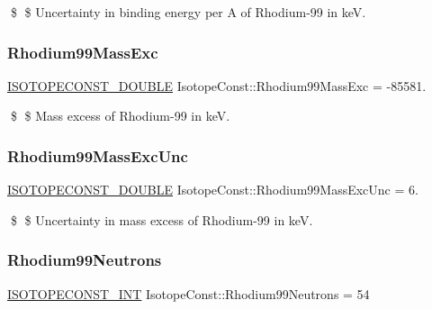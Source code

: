 \$ \$ Uncertainty in binding energy per A of Rhodium-\/99 in keV. \mbox{\label{group___isotope_const-_rhodium-_rh99_ga7954426193fc2316bc047005fba67513}} 
\subsubsection{\texorpdfstring{Rhodium99\+Mass\+Exc}{Rhodium99MassExc}}
{\footnotesize\ttfamily \mbox{\hyperlink{group___isotope_const-_macros_ga8f45a7272ce02c0b4c65c44636ed719a}{I\+S\+O\+T\+O\+P\+E\+C\+O\+N\+S\+T\+\_\+\+D\+O\+U\+B\+LE}} Isotope\+Const\+::\+Rhodium99\+Mass\+Exc = -\/85581.}

\$ \$ Mass excess of Rhodium-\/99 in keV. \mbox{\label{group___isotope_const-_rhodium-_rh99_gab2613ebd2253d2cae677561e1a05a273}} 
\subsubsection{\texorpdfstring{Rhodium99\+Mass\+Exc\+Unc}{Rhodium99MassExcUnc}}
{\footnotesize\ttfamily \mbox{\hyperlink{group___isotope_const-_macros_ga8f45a7272ce02c0b4c65c44636ed719a}{I\+S\+O\+T\+O\+P\+E\+C\+O\+N\+S\+T\+\_\+\+D\+O\+U\+B\+LE}} Isotope\+Const\+::\+Rhodium99\+Mass\+Exc\+Unc = 6.}

\$ \$ Uncertainty in mass excess of Rhodium-\/99 in keV. \mbox{\label{group___isotope_const-_rhodium-_rh99_ga3855f4ab0ba0ebdfed118a94df7e7c8a}} 
\subsubsection{\texorpdfstring{Rhodium99\+Neutrons}{Rhodium99Neutrons}}
{\footnotesize\ttfamily \mbox{\hyperlink{group___isotope_const-_macros_ga5f18360b3e99483a35c32d789e62621c}{I\+S\+O\+T\+O\+P\+E\+C\+O\+N\+S\+T\+\_\+\+I\+NT}} Isotope\+Const\+::\+Rhodium99\+Neutrons = 54}


